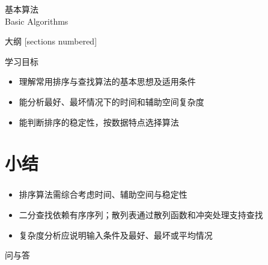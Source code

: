 \begin{standout}[第四章]
    基本算法\\
    Basic Algorithms
\end{standout}

\begin{frame}{大纲}
    [sections numbered]
    \tableofcontents
\end{frame}

\begin{frame}{学习目标}
    \begin{itemize}
        \item 理解常用排序与查找算法的基本思想及适用条件
        \item 能分析最好、最坏情况下的时间和辅助空间复杂度
        \item 能判断排序的稳定性，按数据特点选择算法
    \end{itemize}
\end{frame}




\section{小结}

\begin{frame}
    \frametitle{\insertsectionhead}
    \begin{itemize}
        \item 排序算法需综合考虑时间、辅助空间与稳定性
        \item 二分查找依赖有序序列；散列表通过散列函数和冲突处理支持查找
        \item 复杂度分析应说明输入条件及最好、最坏或平均情况
    \end{itemize}
\end{frame}

\begin{standout}[]
    问与答
\end{standout}
